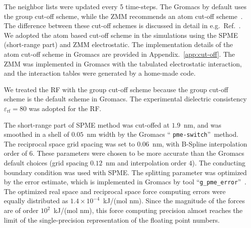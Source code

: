 \documentclass[a4paper,preprint,unsortedaddress,onecolumn,fleqn]{revtex4}
\newcommand{\recheck}[1]{{\color{red} #1}}
\begin{document}
The neighbor lists were updated every 5 time-steps. The Gromacs by default
uses the group cut-off scheme, while the ZMM recommends an atom cut-off
scheme~\cite{fukuda2011molecular,fukuda2013zero}. The difference between
these cut-off schemes is discussed in detail in e.g.~Ref.~\cite%
{hunenberger1998alternative,baumketner2009removing}. We adopted the atom
based cut-off scheme in the simulations using the SPME (short-range part)
and ZMM electrostatic. The implementation details of the atom cut-off scheme
in Gromacs are provided in Appendix.~\ref{app:cut-off}. The ZMM was
implemented in Gromacs with the tabulated electrostatic interaction, and the
interaction tables were generated by a home-made code.

We treated the RF with the group cut-off scheme because the group cut-off
scheme is the default scheme in Gromacs. The experimental dielectric
consistency $\varepsilon _{\text{rf}}=80$ was adopted for the RF. 

The short-range part of SPME method was cut-offed at $1.9$~nm, and was
smoothed in a shell of $0.05$~nm width by the Gromacs \textquotedblleft 
\texttt{pme-switch}\textquotedblright\ method. The reciprocal space grid
spacing was set to $0.06$~nm, with B-Spline interpolation order of $6$.
These parameters were chosen to be more accurate than the Gromacs default
choices (grid spacing $0.12$~nm and interpolation order $4$). The conducting
boundary condition was used with SPME. The splitting parameter was optimized
by the error estimate, which is implemented in Gromacs by tool
\textquotedblleft \texttt{g\_pme\_error}\textquotedblright ~\cite%
{wang2010optimizing}. The optimized real space and reciprocal space force
computing errors were equally distributed as $1.4\times 10^{-4}$~kJ/(mol
nm). Since the magnitude of the forces are of order $10^{2}$~kJ/(mol nm),
this force computing precision almost reaches the limit of the
single-precision representation of the floating point numbers. 
\end{document}
